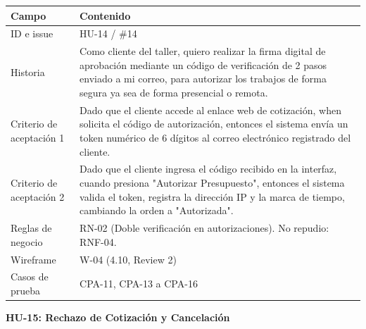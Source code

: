 {\def\LTcaptype{none} %
\begin{longtable}[]{@{}
  >{\raggedright\arraybackslash}p{}
  >{\raggedright\arraybackslash}p{}@{}}
\toprule\noalign{}
\begin{minipage}[b]{\linewidth}\raggedright
\textbf{Campo}
\end{minipage} & \begin{minipage}[b]{\linewidth}\raggedright
\textbf{Contenido}
\end{minipage} \\
\midrule\noalign{}
\endhead
\bottomrule\noalign{}
\endlastfoot
ID e issue & HU-14 / \#14 \\
Historia & Como cliente del taller, quiero realizar la firma digital de
aprobación mediante un código de verificación de 2 pasos enviado a mi
correo, para autorizar los trabajos de forma segura ya sea de forma
presencial o remota. \\
Criterio de aceptación 1 & Dado que el cliente accede al enlace web de
cotización, when solicita el código de autorización, entonces el sistema
envía un token numérico de 6 dígitos al correo electrónico registrado
del cliente. \\
Criterio de aceptación 2 & Dado que el cliente ingresa el código
recibido en la interfaz, cuando presiona "Autorizar Presupuesto",
entonces el sistema valida el token, registra la dirección IP y la marca
de tiempo, cambiando la orden a "Autorizada". \\
Reglas de negocio & RN-02 (Doble verificación en autorizaciones). No
repudio: RNF-04. \\
Wireframe & W-04 (4.10, Review 2) \\
Casos de prueba & CPA-11, CPA-13 a CPA-16 \\
\end{longtable}
}

\textbf{HU-15: Rechazo de Cotización y Cancelación}

